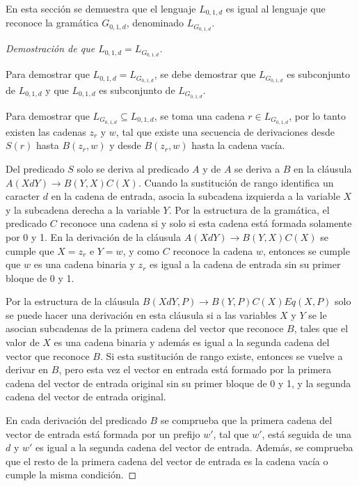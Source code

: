 \documentclass[12pt]{article}
\begin{document}
En esta sección se demuestra que el lenguaje $L_{0,1,d}$ es igual al lenguaje que reconoce la gramática $G_{0,1,d}$,
denominado $L_{G_{0,1,d}}$.

\begin{proof}[Demostración de que $L_{0,1,d}=L_{G_{0,1,d}}$] \
    
    Para demostrar que $L_{0,1,d}=L_{G_{0,1,d}}$, se debe demostrar que $L_{G_{0,1,d}}$ es subconjunto de $L_{0,1,d}$ y que
    $L_{0,1,d}$ es subconjunto de $L_{G_{0,1,d}}$. 
    
    Para demostrar que $L_{G_{0,1,d}}\subseteq L_{0,1,d}$, se toma una cadena $r\in L_{G_{0,1,d}}$, por lo tanto existen las cadenas $z_r$ y $w$, tal que existe una secuencia de derivaciones desde $S(r)$ hasta $B(z_r,w)$ y desde $B(z_r,w)$ hasta la cadena vacía.
    
    Del predicado $S$ solo se deriva al predicado $A$ y de $A$ se deriva a $B$ en la cláusula $A(XdY)\to B(Y,X)C(X)$.  Cuando la sustitución de rango identifica un caracter $d$ en la cadena de entrada, asocia la subcadena izquierda a la variable $X$ y la subcadena derecha a la variable $Y$. Por la estructura de la gramática, el predicado $C$ reconoce una cadena si y solo si esta cadena está formada solamente por 0 y 1. En la derivación de la cláusula $A(XdY)\to B(Y,X)C(X)$ se cumple que $X=z_r$ e $Y=w$, y como $C$ reconoce la cadena $w$, entonces se cumple que $w$ es una cadena binaria y $z_r$ es igual a la cadena de entrada sin su primer bloque de 0 y 1.
    
    Por la estructura de la cláusula $B(XdY,P)\to B(Y,P) C(X) Eq(X,P)$ solo se puede hacer una derivación en esta cláusula si a las variables $X$ y $Y$ se le asocian subcadenas de la primera cadena del vector que reconoce $B$, tales que el valor de $X$ es una cadena binaria y además es igual a la segunda cadena del vector que reconoce $B$. Si esta sustitución de rango existe, entonces se vuelve a derivar en $B$, pero esta vez el vector en entrada está formado por la primera cadena del vector de entrada original sin su primer bloque de 0 y 1, y la segunda cadena del vector de entrada original.
    
    En cada derivación del predicado $B$ se comprueba que la primera cadena del vector de entrada está formada por un prefijo $w'$, tal que $w'$, está seguida de una $d$ y $w'$ es igual a la segunda cadena del vector de entrada. Además, se comprueba que el resto de la primera cadena del vector de entrada es la cadena vacía o cumple la misma condición.
    

\end{proof}
\end{document}
